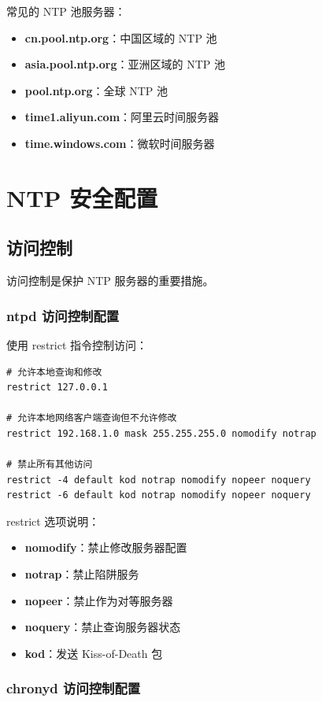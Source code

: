 \documentclass[12pt,UTF8]{ctexbook}
\begin{document}
常见的 NTP 池服务器：
\begin{itemize}
    \item \textbf{cn.pool.ntp.org}：中国区域的 NTP 池
    \item \textbf{asia.pool.ntp.org}：亚洲区域的 NTP 池
    \item \textbf{pool.ntp.org}：全球 NTP 池
    \item \textbf{time1.aliyun.com}：阿里云时间服务器
    \item \textbf{time.windows.com}：微软时间服务器
\end{itemize}

\chapter{NTP 安全配置}
\label{chap:ntp_security}

\section{访问控制}
\label{sec:access_control}

访问控制是保护 NTP 服务器的重要措施。

\subsection{ntpd 访问控制配置}

使用 restrict 指令控制访问：
\begin{verbatim}
# 允许本地查询和修改
restrict 127.0.0.1

# 允许本地网络客户端查询但不允许修改
restrict 192.168.1.0 mask 255.255.255.0 nomodify notrap

# 禁止所有其他访问
restrict -4 default kod notrap nomodify nopeer noquery
restrict -6 default kod notrap nomodify nopeer noquery
\end{verbatim}

restrict 选项说明：
\begin{itemize}
    \item \textbf{nomodify}：禁止修改服务器配置
    \item \textbf{notrap}：禁止陷阱服务
    \item \textbf{nopeer}：禁止作为对等服务器
    \item \textbf{noquery}：禁止查询服务器状态
    \item \textbf{kod}：发送 Kiss-of-Death 包
\end{itemize}

\subsection{chronyd 访问控制配置}
\end{document}
